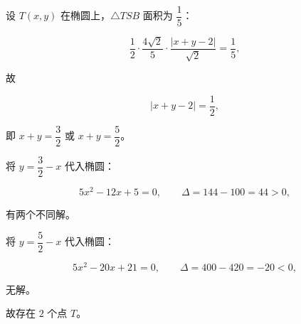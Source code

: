 \begin{answer}
设 $T(x,y)$ 在椭圆上，$\triangle TSB$ 面积为 $\dfrac15$：

\nopagebreak[4]
\[\frac12\cdot\frac{4\sqrt2}5\cdot\frac{|x+y-2|}{\sqrt2}=\frac15,\]

故

\nopagebreak[4]
\[|x+y-2|=\frac12,\]

即 $x+y=\dfrac32$ 或 $x+y=\dfrac52$。

将 $y=\dfrac32-x$ 代入椭圆：

\nopagebreak[4]
\[5x^2-12x+5=0,\qquad \Delta=144-100=44>0,\]

有两个不同解。

将 $y=\dfrac52-x$ 代入椭圆：

\nopagebreak[4]
\[5x^2-20x+21=0,\qquad \Delta=400-420=-20<0,\]

无解。

故存在 $2$ 个点 $T$。


\end{answer}